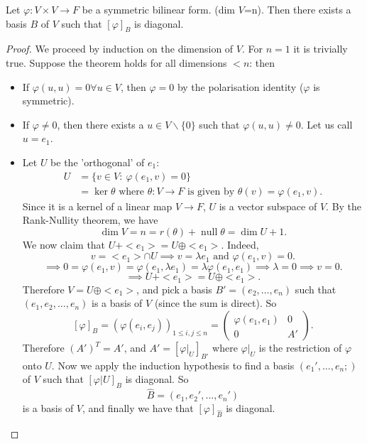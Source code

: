 \documentclass[a4paper]{scrartcl}
\begin{document}
\begin{theorem}
     Let $\varphi: V \times V \rightarrow F$ be a symmetric bilinear form. (dim $V$=n). Then there exists a basis $B$ of $V$ such that $[\varphi]_B$ is diagonal.
\end{theorem}
\begin{proof}
     We proceed by induction on the dimension of $V$. For $n=1$ it is trivially true. Suppose the theorem holds for all dimensions $<n$: then
     \begin{itemize}
         \item If $\varphi (u,u)=0 \forall u \in V$, then $\varphi=0$ by the polarisation identity ($\varphi $ is symmetric).
         \item If $\varphi \neq 0$, then there exists a $u \in V \backslash \{0\}$ such that $\varphi (u,u) \neq 0$. Let us call $u=e_1$.
         \item Let $U$ be the 'orthogonal' of $e_1$: 
         \begin{equation*}
               \begin{split}
                    U&=\{v \in V: \ \varphi (e_1,v)=0\}\\
                    &=\operatorname{ker} \theta \text{ where } \theta:V \rightarrow F \text{ is given by } \theta (v)= \varphi (e_1,v).
               \end{split}
         \end{equation*}
         Since it is a kernel of a linear map $V \rightarrow F$, $U$ is a vector subspace of $V$. By the Rank-Nullity theorem, we have 
         \[\operatorname{dim} V=n= r(\theta)+ \operatorname{null}  \theta=\operatorname{dim}U+1.\]
         We now claim that $U+<e_1>=U \oplus <e_1>$. Indeed, 
         \[v= <e_1> \cap U \implies v= \lambda e_1 \text{ and }  \varphi(e_1,v)=0 .\]
         \[\implies 0=\varphi (e_1,v)=\varphi (e_1, \lambda e_1)=\lambda \varphi (e_1,e_1) \implies \lambda=0 \implies v=0.\]
         \[\implies U+<e_1>=U \oplus <e_1>.\]
         Therefore $V=U \oplus <e_1>$, and pick a basis $B'=(e_2, \ldots ,e_n)$ such that $(e_1, e_2, \ldots , e_n)$ is a basis of $V$ (since the sum is direct). So 
         \[[\varphi]_B=(\varphi(e_i,e_j))_{1 \leq i,j \leq n}=\left(
          \begin{array}{c|c}
          \varphi (e_1,e_1) &0\\
            \hline
            0&A'
          \end{array}
          \right)
         .\]
         Therefore $(A')^T=A'$, and 
         $A'=[\varphi|_U]_{B'}$ where $\varphi|_U$ is the restriction of $\varphi$ onto $U$. Now we apply the induction hypothesis to find a basis $(e_1', \ldots ,e_n;)$ of $V$ such that $[\varphi|U]_{B}$ is diagonal. So 
         \[\hat{B}=(e_1,e_2',\ldots ,e_n')\] is a basis of $V$, and finally we have that $[\varphi]_{\hat{B}}$ is diagonal.      
     \end{itemize}
\end{proof}
\end{document}
